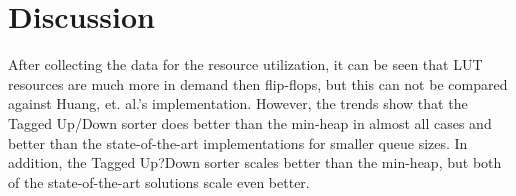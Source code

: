 \section{Discussion}
\label{sec:discussion}

After collecting the data for the resource utilization, it can be seen that LUT resources are much more in demand then flip-flops, but this can not be compared against Huang, et. al.'s implementation. However, the trends show that the Tagged Up/Down sorter does better than the min-heap in almost all cases and better than the state-of-the-art implementations for smaller queue sizes. In addition, the Tagged Up?Down sorter scales better than the min-heap, but both of the state-of-the-art solutions scale even better.